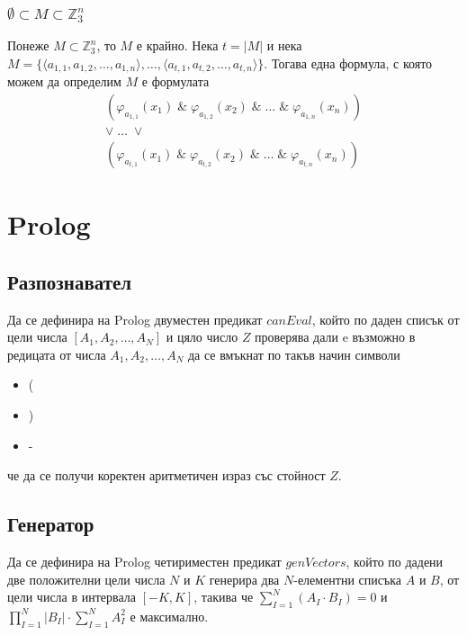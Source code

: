 \documentclass[17pt]{extarticle}
\begin{document}
\subsubsection{\(\emptyset \subset M \subset \mathbb{Z}_3^n\)}
Понеже \(M \subset \mathbb{Z}_3^n\), то \(M\) е крайно. Нека \(t = |M|\) и нека \(M = \{ \langle a_{1, 1}, a_{1, 2}, \dots, a_{1, n} \rangle, \dots,  \langle a_{t, 1}, a_{t, 2}, \dots, a_{t, n} \rangle \}\). Тогава една формула, с която можем да определим \(M\) е формулата
\begin{align*}
(\varphi_{a_{1, 1}}(x_1) \;\&\; \varphi_{a_{1, 2}}(x_2) \;\&\; \dots \;\&\; \varphi_{a_{1, n}}(x_n)) \\
\lor\; \dots \; \lor \\
(\varphi_{a_{t, 1}}(x_1) \;\&\; \varphi_{a_{t, 2}}(x_2) \;\&\; \dots \;\&\; \varphi_{a_{t, n}}(x_n))
\end{align*}

\section{Prolog}

\subsection{Разпознавател}
Да се дефинира на Prolog двуместен предикат \(canEval\),
който по даден списък от цели числа \([A_1, A_2, \dots, A_N]\) и цяло число \(Z\)
проверява дали e възможно в редицата от числа \(A_1, A_2, \dots, A_N\) да се вмъкнат по такъв начин символи
\begin{itemize}
    \item (
    \item )
    \item -
\end{itemize}
че да се получи коректен аритметичен израз със стойност \(Z\).

\subsection{Генератор}
Да се дефинира на Prolog четириместен предикат \(genVectors\),
който по дадени две положителни цели числа \(N\) и \(K\) генерира два \(N\)-елементни списъка \(A\) и \(B\), от цели числа в интервала \([-K, K]\),
такива че \(\displaystyle\sum_{I = 1}^{N} (A_I \cdot B_I) = 0\) и \(\displaystyle\prod_{I = 1}^{N} |B_I| \cdot \displaystyle\sum_{I = 1}^{N} A_I^2\) е максимално.
\end{document}
